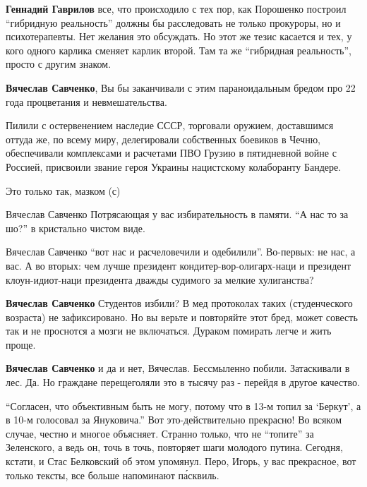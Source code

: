 \begin{itemize}
\begin{itemize}
\textbf{Геннадий Гаврилов} все, что происходило с тех пор, как Порошенко
построил \enquote{гибридную реальность} должны бы расследовать не только прокуроры, но
и психотерапевты. Нет желания это обсуждать. Но этот же тезис касается и тех,
у кого одного карлика сменяет карлик второй. Там та же \enquote{гибридная реальность},
просто с другим знаком.


\textbf{Вячеслав Савченко}, Вы бы заканчивали с этим параноидальным бредом про 22 года процветания и невмешательства.

Пилили с остервенением наследие СССР, торговали оружием, доставшимся оттуда же,
по всему миру, делегировали собственных боевиков в Чечню, обеспечивали
комплексами и расчетами ПВО Грузию в пятидневной войне с Россией, присвоили
звание героя Украины нацистскому колаборанту Бандере.

Это только так, мазком (с)


Вячеслав Савченко Потрясающая у вас избирательность в памяти. \enquote{А нас то за шо?} в кристально чистом виде.


Вячеслав Савченко \enquote{вот нас и расчеловечили и одебилили}.
Во-первых: не нас, а вас.  А во вторых: чем лучше президент
кондитер-вор-олигарх-наци и президент клоун-идиот-наци президента дважды
судимого за мелкие хулиганства?


\textbf{Вячеслав Савченко} Студентов избили? В мед протоколах таких (студенческого
возраста) не зафиксировано. Но вы верьте и повторяйте этот бред, может совесть
так и не проснотся а мозги не включаться. Дураком помирать легче и жить проще.

\textbf{Вячеслав Савченко} и да и нет, Вячеслав.  Бессмыленно побили.
Затаскивали в лес.  Да.  Но граждане перещеголяли это в тысячу раз - перейдя в
другое качество.


\enquote{Согласен, что объективным быть не могу, потому что в 13-м топил за 
\enquote{Беркут},
а в 10-м голосовал за Януковича.} Вот это-действительно прекрасно! Во всяком
случае, честно и многое объясняет. Странно только, что не \enquote{топите} за
Зеленского, а ведь он, точь в точь, повторяет шаги молодого путина. Сегодня,
кстати, и Стас Белковский об этом упомянул. Перо, Игорь, у вас прекрасное, вот
только тексты, все больше напоминают па́сквиль.


\end{itemize}
\end{itemize}
